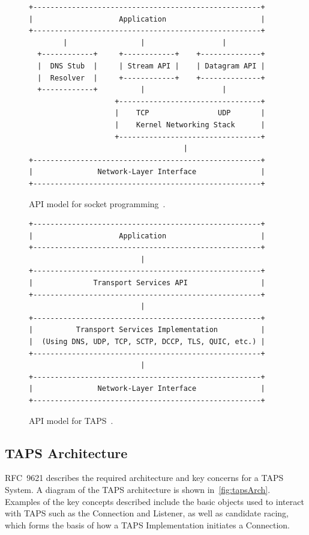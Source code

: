 \begin{figure}[htbp]
    \centering
    \begin{BVerbatim}
+-----------------------------------------------------+
|                    Application                      |
+-----------------------------------------------------+
        |                 |                  |
  +------------+     +------------+    +--------------+
  |  DNS Stub  |     | Stream API |    | Datagram API |
  |  Resolver  |     +------------+    +--------------+
  +------------+          |                  |
                    +---------------------------------+
                    |    TCP                UDP       |
                    |    Kernel Networking Stack      |
                    +---------------------------------+
                                    |
+-----------------------------------------------------+
|               Network-Layer Interface               |
+-----------------------------------------------------+
    \end{BVerbatim}
    \caption[Socket programming API model]{API model for socket programming~\cite{rfc9622}.}
    \label{fig:socket-programming-api-model}
\end{figure}

\begin{figure}[htbp]
    \centering
    \begin{BVerbatim}
+-----------------------------------------------------+
|                    Application                      |
+-----------------------------------------------------+
                          |
+-----------------------------------------------------+
|              Transport Services API                 |
+-----------------------------------------------------+
                          |
+-----------------------------------------------------+
|          Transport Services Implementation          |
|  (Using DNS, UDP, TCP, SCTP, DCCP, TLS, QUIC, etc.) |
+-----------------------------------------------------+
                          |
+-----------------------------------------------------+
|               Network-Layer Interface               |
+-----------------------------------------------------+
    \end{BVerbatim}
    \caption[TAPS API model]{API model for TAPS~\cite{rfc9621}.}
    \label{fig:taps-api-model}
\end{figure}

\subsection{TAPS Architecture} \label{sec:tapsArch}
RFC~9621 describes the required architecture and key concerns
for a TAPS System. A diagram of the TAPS architecture is shown in~\cref{fig:tapsArch}.
Examples of the key concepts described
include the basic objects used to interact with TAPS such as
the Connection and Listener, as well as candidate racing, which forms
the basis of how a TAPS Implementation initiates a Connection.

